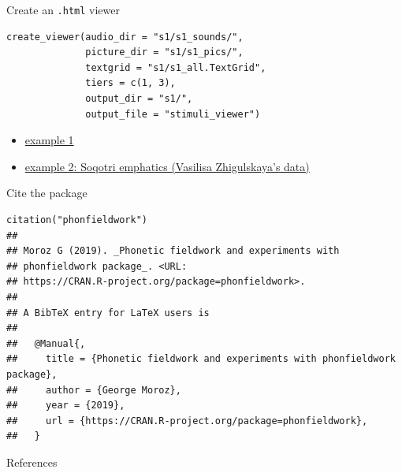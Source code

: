 \documentclass[13pt, t]{beamer}
\begin{document}
\begin{frame}[fragile]{Create an \texttt{.html} viewer}
\begin{verbatim}
create_viewer(audio_dir = "s1/s1_sounds/",
              picture_dir = "s1/s1_pics/", 
              textgrid = "s1/s1_all.TextGrid",
              tiers = c(1, 3),
              output_dir = "s1/",
              output_file = "stimuli_viewer")
\end{verbatim}
\begin{itemize}
\item \href{https://agricolamz.github.io/phonfieldwork/s1/stimuli_viewer.html}{example 1}
\item \href{https://lingconlab.github.io/soqotri_emphatics/create_html.html}{example 2: Soqotri emphatics (Vasilisa Zhigulskaya's data)}
\end{itemize}
\end{frame}

\begin{frame}[fragile]{Cite the package}
\begin{verbatim}
citation("phonfieldwork")
## 
## Moroz G (2019). _Phonetic fieldwork and experiments with
## phonfieldwork package_. <URL:
## https://CRAN.R-project.org/package=phonfieldwork>.
## 
## A BibTeX entry for LaTeX users is
## 
##   @Manual{,
##     title = {Phonetic fieldwork and experiments with phonfieldwork package},
##     author = {George Moroz},
##     year = {2019},
##     url = {https://CRAN.R-project.org/package=phonfieldwork},
##   }
\end{verbatim}
\end{frame}


\begin{frame}{References}
\footnotesize


\end{frame}
\end{document}
